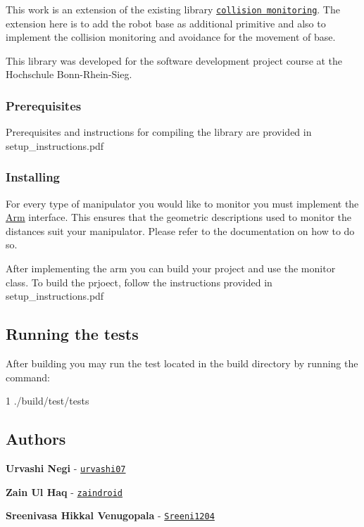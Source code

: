 This work is an extension of the existing library \textquotesingle{}\href{https://github.com/HBRS-SDP/sdp_ss20_collision_monitoring_for_robotic_manipulators}{\tt collision monitoring}\textquotesingle{}. The extension here is to add the robot base as additional primitive and also to implement the collision monitoring and avoidance for the movement of base.

This library was developed for the software development project course at the Hochschule Bonn-\/\+Rhein-\/\+Sieg.

\subsubsection*{Prerequisites}

Prerequisites and instructions for compiling the library are provided in setup\+\_\+instructions.\+pdf

\subsubsection*{Installing}

For every type of manipulator you would like to monitor you must implement the \hyperlink{class_arm}{Arm} interface. This ensures that the geometric descriptions used to monitor the distances suit your manipulator. Please refer to the documentation on how to do so.

After implementing the arm you can build your project and use the monitor class. To build the prjoect, follow the instructions provided in setup\+\_\+instructions.\+pdf

\subsection*{Running the tests}

After building you may run the test located in the build directory by running the command\+:


\begin{DoxyCode}
1 ./build/test/tests
\end{DoxyCode}
 \subsection*{Authors}


\begin{DoxyItemize}
\item {\bfseries Urvashi Negi} -\/ \href{https://github.com/urvashi07}{\tt urvashi07}
\item {\bfseries Zain Ul Haq} -\/ \href{https://github.com/zaindroid}{\tt zaindroid}
\item {\bfseries Sreenivasa Hikkal Venugopala} -\/ \href{https://github.com/Sreeni1204}{\tt Sreeni1204}
\end{DoxyItemize}

